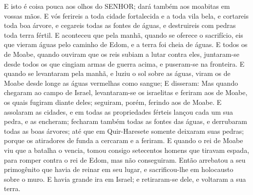 {{{{  E isto é coisa pouca aos olhos do SENHOR; dará também aos moabitas em vossas mãos.
  E vós ferireis a toda cidade fortalecida e a toda vila bela, e cortareis toda boa árvore, e cegareis todas as fontes de águas, e destruireis com pedras toda terra fértil}}}.
  E aconteceu que pela manhã, quando se oferece o sacrifício, eis que vieram águas pelo caminho de Edom, e a terra foi cheia de águas.
  E todos os de Moabe, quando ouviram que os reis subiam a lutar contra eles, juntaram-se desde todos os que cingiam armas de guerra acima, e puseram-se na fronteira.
  E quando se levantaram pela manhã, e luziu o sol sobre as águas, viram os de Moabe desde longe as águas vermelhas como sangue;
  E disseram: 
  Mas quando chegaram ao campo de Israel, levantaram-se os israelitas e feriram aos de Moabe, os quais fugiram diante deles; seguiram, porém, ferindo aos de Moabe.
  E assolaram as cidades, e em todas as propriedades férteis lançou cada um sua pedra, e as encheram; fecharam também todas as fontes das águas, e derrubaram todas as boas árvores; até que em Quir-Haresete somente deixaram suas pedras; porque os atiradores de funda a cercaram e a feriram.
  E quando o rei de Moabe viu que a batalha o vencia, tomou consigo setecentos homens que tiravam espada, para romper contra o rei de Edom, mas não conseguiram.
  Então arrebatou a seu primogênito que havia de reinar em seu lugar, e sacrificou-lhe em holocausto sobre o muro. E havia grande ira em Israel; e retiraram-se dele, e voltaram a sua terra.
\par }

